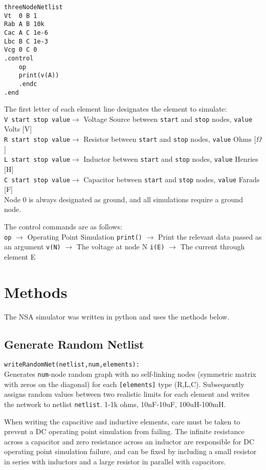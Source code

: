 \documentclass[11pt,twoside]{mitthesis}
\begin{document}
\begin{Verbatim}[fontsize=\footnotesize]
threeNodeNetlist
Vt	0 B 1
Rab A B 10k
Cac A C 1e-6
Lbc B C 1e-3
Vcg 0 C 0
.control
	op
	print(v(A))
	.endc
.end
\end{Verbatim}

The first letter of each element line designates the element to simulate: \\
\texttt{V start stop value}$\rightarrow$ Voltage Source between \texttt{start} and \texttt{stop} nodes, \texttt{value} Volts [V]\\
\texttt{R start stop value}$\rightarrow$ Resistor between \texttt{start} and \texttt{stop} nodes, \texttt{value} Ohms [$\Omega$]\\
\texttt{L start stop value}$\rightarrow$ Inductor between \texttt{start} and \texttt{stop} nodes, \texttt{value} Henries [H]\\
\texttt{C start stop value}$\rightarrow$ Capacitor between \texttt{start} and \texttt{stop} nodes, \texttt{value} Farads [F]\\

Node 0 is always designated as ground, and all simulations require a ground node.

The control commands are as follows:\\
\texttt{op} $\rightarrow$ Operating Point Simulation
\texttt{print()} $\rightarrow$ Print the relevant data passed as an argument
\texttt{v(N)} $\rightarrow$ The voltage at node N
\texttt{i(E)} $\rightarrow$ The current through element E

\section{Methods}
The NSA simulator was written in python and uses the methods below.

\subsection{Generate Random Netlist}
\texttt{writeRandomNet(netlist,num,elements):}\\
Generates \texttt{num}-node random graph with no self-linking nodes (symmetric matrix with zeros on the diagonal) for each \texttt{[elements]} type (R,L,C).
Subsequently assigns random values between two realistic limits for each element and writes the network to netlist \texttt{netlist}.
1-1k ohms, 10nF-10uF, 100uH-100mH.

When writing the capacitive and inductive elements, care must be taken to prevent a DC operating point simulation from failing.
The infinite resistance across a capacitor and zero resistance across an inductor are responsible for DC operating point simulation failure, and can be fixed by including a small resistor in series with inductors and a large resistor in parallel with capacitors. 
\end{document}
